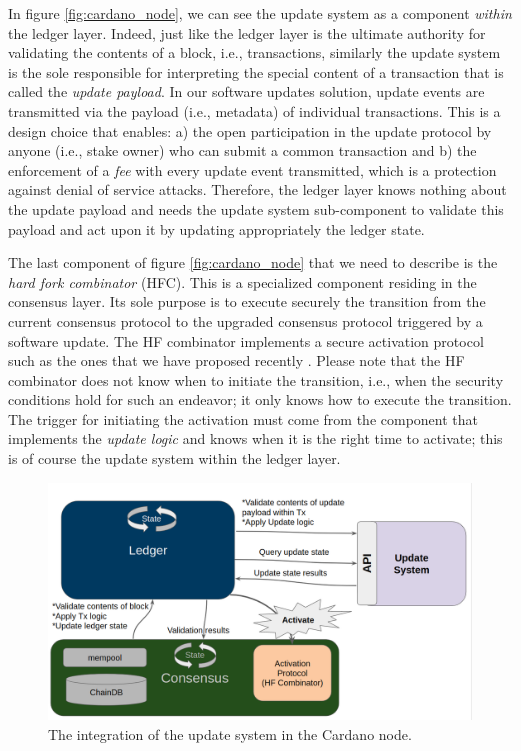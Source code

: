 In figure \ref{fig:cardano_node}, we can see the update system as a component
\emph{within} the ledger layer. Indeed, just like the ledger layer is the
ultimate authority for validating the contents of a block, i.e., transactions,
similarly the update system is the sole responsible for interpreting the
special content of a transaction that is called the \emph{update payload}. In
our software updates solution, update events are transmitted via the payload
(i.e., metadata) of individual transactions. This is a design choice that
enables: a) the open participation in the update protocol by anyone (i.e.,
stake owner) who can submit a common transaction and b) the enforcement of a
\emph{fee} with every update event transmitted, which is a protection against
denial of service attacks. Therefore, the ledger layer knows nothing about the
update payload and needs the update system sub-component to validate this
payload and act upon it by updating appropriately the ledger state.

The last component of figure \ref{fig:cardano_node} that we need to describe is
the \emph{hard fork combinator} (HFC). This is a specialized
component residing in the consensus layer. Its sole purpose is to execute
securely the transition from the current consensus protocol to the upgraded
consensus protocol triggered by a software update. The HF combinator implements
a secure activation protocol such as the ones that we have proposed recently
\cite{secure_activation}. Please note that the HF combinator does not know when
to initiate the transition, i.e., when the security conditions hold for such an
endeavor; it only knows how to execute the transition. The trigger for
initiating the activation must come from the component that implements the
\emph{update logic} and knows when it is the right time to activate; this is of
course the update system within the ledger layer.

\begin{figure}[h!] %
	\centering
	\includegraphics[width=0.8\columnwidth,
	keepaspectratio]{figures/cardano_node_integration.png}
	\caption{The integration of the update system in the Cardano node.}
	\label{fig:cardano_node_integation}
\end{figure}

